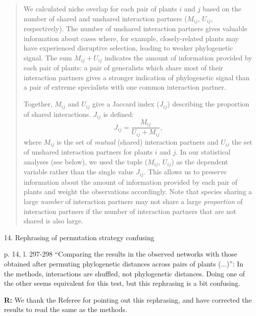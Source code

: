 \documentclass[12pt]{letter}
\newenvironment{refquote}{\bigskip \begin{it}}{\end{it}\smallskip}
\begin{document}
		\begin{quotation}

			We calculated niche overlap for each pair of plants $i$ and $j$ based on the number of shared and unshared interaction partners ($M_{ij}$, $U_{ij}$, respectively). 
			The number of unshared interaction 
			partners gives valuable information about cases where, for example, 
			closely-related plants may have experienced disruptive selection, leading to weaker phylogenetic signal. 
			The sum $M_{ij} + U_{ij}$ indicates the amount of information  provided by each pair of plants: a pair of generalists which share most of their interaction partners gives a stronger indication of phylogenetic signal than a pair of extreme specialists with one common interaction partner.


			Together, $M_{ij}$ and $U_{ij}$ give a Jaccard index ($J_{ij}$) describing 
			the proportion of shared interactions. $J_{ij}$ is defined: 
			\begin{equation}
			J_{ij} = \frac{M_{ij}}{U_{ij}+M_{ij}} ,
			\end{equation}
			where $M_{ij}$ is the set of \emph{mutual} (shared) interaction partners and $U_{ij}$ the set of unshared interaction partners for plants $i$ and $j$.
			In our statistical analyses (see below), we used the tuple ($M_{ij}$, $U_{ij}$) as the
			dependent variable rather than the single value $J_{ij}$. 
			This allows us to preserve information about the amount of information provided by each pair of plants and weight the observations accordingly.
			Note that species sharing a large \emph{number} of interaction partners may not share a large \emph{proportion} of interaction partners if the number of interaction partners that are not shared is also large.

		    \end{quotation}


	14. Rephrasing of permutation strategy confusing

		\begin{refquote}
			p. 14, l. 297-298 “Comparing the results in the observed networks with those obtained after permuting phylogenetic distances across pairs of plants (...)”: In the methods, interactions are shuffled, not phylogenetic distances. Doing one of the other seems equivalent for this test, but this rephrasing is a bit confusing.
		\end{refquote}


		\textbf{R:} We thank the Referee for pointing out this rephrasing, and have corrected the results to read the same as the methods.
\end{document}
